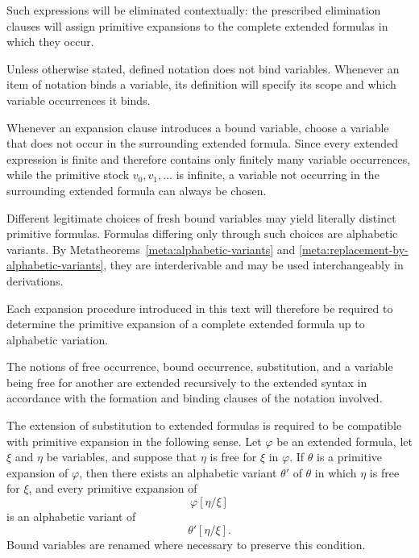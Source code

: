 Such expressions will be eliminated contextually: the prescribed
elimination clauses will assign primitive expansions to the complete
extended formulas in which they occur.


Unless otherwise stated, defined notation does not bind variables. Whenever
an item of notation binds a variable, its definition will specify its scope
and which variable occurrences it binds.

Whenever an expansion clause introduces a bound variable, choose a variable that does not occur in the surrounding extended formula. Since every extended expression is finite and therefore contains only finitely many variable occurrences, while the primitive stock \(v_0,v_1,\ldots\) is infinite, a variable not occurring in the surrounding extended formula can always be chosen.

Different legitimate choices of fresh bound variables may yield literally
distinct primitive formulas. Formulas differing only through such choices
are alphabetic variants. By
Metatheorems~\ref{meta:alphabetic-variants} and
\ref{meta:replacement-by-alphabetic-variants}, they are interderivable and
may be used interchangeably in derivations.

Each expansion procedure introduced in this text will therefore be required
to determine the primitive expansion of a complete extended formula up to
alphabetic variation.


The notions of free occurrence, bound occurrence, substitution, and a
variable being free for another are extended recursively to the extended
syntax in accordance with the formation and binding clauses of the notation
involved.

The extension of substitution to extended formulas is required to be
compatible with primitive expansion in the following sense. Let
\(\varphi\) be an extended formula, let \(\xi\) and \(\eta\) be variables,
and suppose that \(\eta\) is free for \(\xi\) in \(\varphi\). If \(\theta\) is a primitive expansion of \(\varphi\), then there
exists an alphabetic variant \(\theta'\) of \(\theta\) in which
\(\eta\) is free for \(\xi\), and every primitive expansion of
\[
\varphi[\eta/\xi]
\]
is an alphabetic variant of
\[
\theta'[\eta/\xi].
\]
Bound variables are renamed where necessary to preserve this condition.


